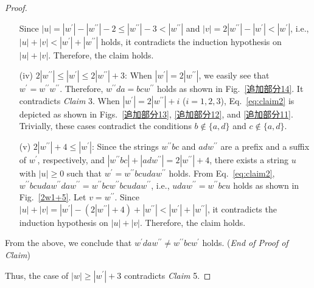 \begin{proof}
\begin{enumerate}
  Since $|u| = |w^{\prime}| - |w^{\prime\prime}| - 2 \leq |w^{\prime\prime}| - 3 < |w^{\prime\prime}|$ and $|v| = 2|w^{\prime\prime}| - |w^{\prime}| < |w^{\prime}|$, i.e., $|u| + |v| < |w^{\prime}| + |w^{\prime\prime}|$ holds, it contradicts the induction hypothesis on $|u| + |v|$. Therefore, the claim holds.
  \item[(iv)] $2|w^{\prime\prime}| \le |w^{\prime}| \le 2|w^{\prime\prime}|+3$:
  When $|w^{\prime}|=2|w^{\prime\prime}|$, we easily see that $w^{\prime} = w^{\prime\prime}w^{\prime\prime}$.
  Therefore, $w^{\prime\prime}da = bcw^{\prime\prime}$ holds as shown in Fig.~\ref{追加部分14}.
  It contradicts \textit{Claim} 3.
  When $|w^{\prime}|=2|w^{\prime\prime}|+i$ ($i=1,2,3$), Eq.~\ref{eq:claim2} is depicted as shown in Figs.~\ref{追加部分13}, \ref{追加部分12}, and \ref{追加部分11}. Trivially, these cases contradict the conditions $b \not\in \{a,d\}$ and $c \not\in \{a,d\}$.
  \item[(v)] $2|w^{\prime\prime}|+4 \leq |w^{\prime}|$:
  Since the strings $w^{\prime\prime}bc$ and $adw^{\prime\prime}$ are a prefix and a suffix of $w^{\prime}$, respectively, and $|w^{\prime\prime}bc| + |adw^{\prime\prime}| = 2|w^{\prime\prime}| + 4$, there exists a string $u$ with $|u| \geq 0$ such that $w^{\prime} = w^{\prime\prime}bcudaw^{\prime\prime}$ holds. From Eq.~\ref{eq:claim2}, $w^{\prime\prime}bcudaw^{\prime\prime}daw^{\prime\prime} = w^{\prime\prime}bcw^{\prime\prime}bcudaw^{\prime\prime}$, i.e., $udaw^{\prime\prime} = w^{\prime\prime}bcu$ holds as shown in Fig.~\ref{2w1+5}.
  Let $v = w^{\prime\prime}$.
  Since $|u| + |v| = |w^{\prime}|- (2|w^{\prime\prime}| + 4) + |w^{\prime\prime}| < |w^{\prime}| + |w^{\prime\prime}|$, it contradicts the induction hypothesis on $|u| + |v|$. Therefore, the claim holds.
  \end{enumerate}
  From the above, we conclude that $w^{\prime}daw^{\prime\prime} \not = w^{\prime\prime}bcw^{\prime}$ holds.
  (\textit{End of Proof of Claim})

\smallskip

\noindent
Thus, the case of $|w| \geq |w^{\prime}| + 3$ contradicts \textit{Claim} 5. 


\end{proof}
